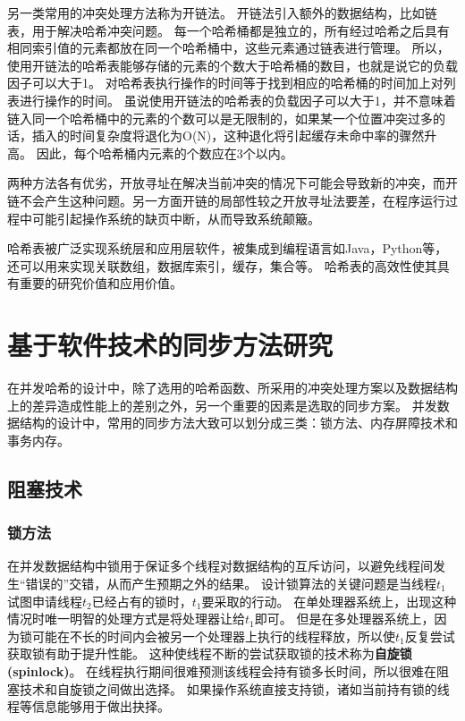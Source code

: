 另一类常用的冲突处理方法称为开链法。
开链法引入额外的数据结构，比如链表，用于解决哈希冲突问题。
每一个哈希桶都是独立的，所有经过哈希之后具有相同索引值的元素都放在同一个哈希桶中，这些元素通过链表进行管理。
所以，使用开链法的哈希表能够存储的元素的个数大于哈希桶的数目，也就是说它的负载因子可以大于1。
对哈希表执行操作的时间等于找到相应的哈希桶的时间加上对列表进行操作的时间。
虽说使用开链法的哈希表的负载因子可以大于1，并不意味着链入同一个哈希桶中的元素的个数可以是无限制的，如果某一个位置冲突过多的话，插入的时间复杂度将退化为O(N)，这种退化将引起缓存未命中率的骤然升高\cite{black1998graph}。
因此，每个哈希桶内元素的个数应在3个以内。

两种方法各有优劣，开放寻址在解决当前冲突的情况下可能会导致新的冲突，而开链不会产生这种问题。另一方面开链的局部性较之开放寻址法要差，在程序运行过程中可能引起操作系统的缺页中断，从而导致系统颠簸。

哈希表被广泛实现系统层和应用层软件，被集成到编程语言如Java，Python等，还可以用来实现关联数组，数据库索引，缓存，集合等。
哈希表的高效性使其具有重要的研究价值和应用价值。

\section{基于软件技术的同步方法研究}

在并发哈希的设计中，除了选用的哈希函数、所采用的冲突处理方案以及数据结构上的差异造成性能上的差别之外，另一个重要的因素是选取的同步方案。
并发数据结构的设计中，常用的同步方法大致可以划分成三类：锁方法、内存屏障技术和事务内存。

\subsection{阻塞技术}
\subsubsection{锁方法}
在并发数据结构中锁用于保证多个线程对数据结构的互斥访问，以避免线程间发生“错误的”交错，从而产生预期之外的结果。
设计锁算法的关键问题是当线程$t_1$试图申请线程$t_2$已经占有的锁时，$t_1$要采取的行动。
在单处理器系统上，出现这种情况时唯一明智的处理方式是将处理器让给$t_1$即可。
但是在多处理器系统上，因为锁可能在不长的时间内会被另一个处理器上执行的线程释放，所以使$t_1$反复尝试获取锁有助于提升性能。
这种使线程不断的尝试获取锁的技术称为\textbf{自旋锁(spinlock)}。
在线程执行期间很难预测该线程会持有锁多长时间，所以很难在阻塞技术和自旋锁之间做出选择。
如果操作系统直接支持锁，诸如当前持有锁的线程等信息能够用于做出抉择。

